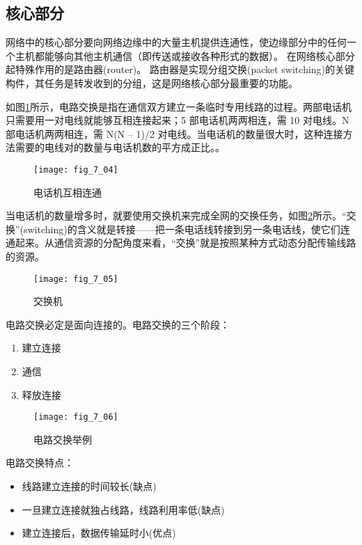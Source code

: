\subsection{核心部分}
网络中的核心部分要向网络边缘中的大量主机提供连通性，使边缘部分中的任何一个主机都能够向其他主机通信（即传送或接收各种形式的数据）。
在网络核心部分起特殊作用的是路由器(router)。
路由器是实现分组交换(packet switching)的关键构件，其任务是转发收到的分组，这是网络核心部分最重要的功能。


如图\ref{fig_7_04}所示，电路交换是指在通信双方建立一条临时专用线路的过程。两部电话机只需要用一对电线就能够互相连接起来；5 部电话机两两相连，需 10 对电线。N 部电话机两两相连，需 N(N – 1)/2 对电线。当电话机的数量很大时，这种连接方法需要的电线对的数量与电话机数的平方成正比。。

\begin{figure}
  \centering
  \texttt{[image: fig\_7\_04]}
  \caption{电话机互相连通}\label{fig_7_04}
\end{figure}


当电话机的数量增多时，就要使用交换机来完成全网的交换任务，如图\ref{fig_7_05}所示。“交换”(switching)的含义就是转接——把一条电话线转接到另一条电话线，使它们连通起来。从通信资源的分配角度来看，“交换”就是按照某种方式动态分配传输线路的资源。


\begin{figure}
  \centering
  \texttt{[image: fig\_7\_05]}
  \caption{交换机}\label{fig_7_05}
\end{figure}

电路交换必定是面向连接的。电路交换的三个阶段：

\begin{enumerate}
          \item 建立连接
          \item 通信
          \item 释放连接
\end{enumerate}


\begin{figure}
  \centering
  \texttt{[image: fig\_7\_06]}
  \caption{电路交换举例}\label{fig_7_06}
\end{figure}


电路交换特点：

\begin{itemize}
  \item 线路建立连接的时间较长(缺点)
  \item 一旦建立连接就独占线路，线路利用率低(缺点)
  \item 建立连接后，数据传输延时小(优点)
\end{itemize}

